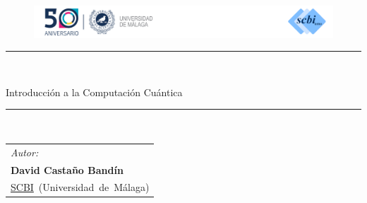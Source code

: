 \documentclass[a4paper,11pt]{book} %
\numberwithin{equation}{chapter}
\begin{document}
\renewcommand{\tablename}{Tabla}

\begin{center}

	\begin{figure}[t]
	\centering
	\includegraphics[width=1\linewidth]{Figuras/Fig_logo_UMA_scbi.png}
	\end{figure}

\vspace{3cm}
\rule{65mm}{0.2mm}\\
\vspace{1cm}

{\sc\LARGE Introducción a la Computación Cuántica}


\vspace{0.5cm}
\rule{65mm}{0.2mm}\\
\vspace{2cm}
\end{center}


\begin{tabular}{l}
{\sl\large Autor: } \\
{\bf\Large David Castaño Bandín} \\
\vspace{1em}\mbox{\hyperlink{https://www.scbi.uma.es/site/}{SCBI} (Universidad de Málaga)} \\
%
%
\end{tabular}
\end{document}
